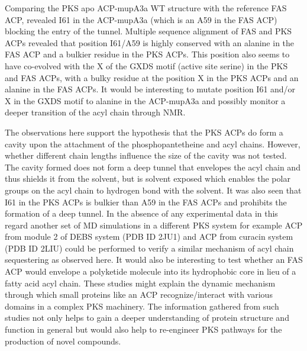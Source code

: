 Comparing the PKS apo ACP-mupA3a WT structure with the reference FAS ACP, revealed I61 in the ACP-mupA3a (which is an A59 in the FAS ACP) blocking the entry of the tunnel. Multiple sequence alignment of FAS and PKS ACPs revealed that position I61/A59 is highly conserved with an alanine in the FAS ACP and a bulkier residue in the PKS ACPs. This position also seems to have co-evolved with the X of the GXDS motif (active site serine) in the PKS and FAS ACPs, with a bulky residue at the position X in the PKS ACPs and an alanine in the FAS ACPs. It would be interesting to mutate position I61 and/or X in the GXDS motif to alanine in the ACP-mupA3a and possibly monitor a deeper transition of the acyl chain through NMR.

The observations here support the hypothesis that the PKS ACPs do form a cavity upon the attachment of the phosphopantetheine and acyl chains. However, whether different chain lengths influence the size of the cavity was not tested. %
The cavity formed does not form a deep tunnel that envelopes the acyl chain and thus shields it from the solvent, but is solvent exposed which enables the polar groups on the acyl chain to hydrogen bond with the solvent. It was also seen that I61 in the PKS ACPs is bulkier than A59 in the FAS ACPs and prohibits the formation of a deep tunnel. In the absence of any experimental data in this regard another set of MD simulations in a different PKS system for example ACP from module 2 of DEBS system (PDB ID 2JU1) and ACP from curacin system (PDB ID 2LIU) could be performed to verify a similar mechanism of acyl chain sequestering as observed here. It would also be interesting to test whether an FAS ACP would envelope a polyketide molecule into its  hydrophobic core in lieu of a fatty acid acyl chain. These studies might explain the dynamic mechanism through which small proteins like an ACP recognize/interact with various domains in a complex PKS machinery. The information gathered from such studies not only helps to gain a deeper understanding of protein structure and function in general but would also help to re-engineer PKS pathways for the production of novel compounds. 